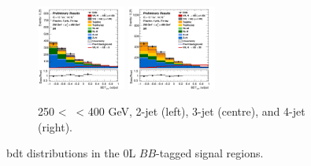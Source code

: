 \begin{figure}[h!]
\begin{subfigure}[b]{\textwidth}
        \includegraphics[width=0.32\textwidth]{Images/VH/Own_fit/postfit_VHbb/Region_distmva_BMax400_BMin250_DSR_J3_TTypebb_T2_L0_Y6051_GlobalFit_conditionnal_mu1.png}
        \includegraphics[width=0.32\textwidth]{Images/VH/Own_fit/postfit_VHbb/Region_distmva_BMax400_BMin250_DSR_J4_TTypebb_T2_L0_Y6051_GlobalFit_conditionnal_mu1.png}
        \caption{250 < \ptv\ < 400 GeV, 2-jet (left), 3-jet (centre), and 4-jet (right).}
        \label{fig:plots_VHbb_OL_250_SR}
    \end{subfigure}
    \caption{\gls{bdt} distributions in the 0L $BB$-tagged signal regions.}
    \label{fig:plots_VHbb_OL_SR}
\end{figure} 

